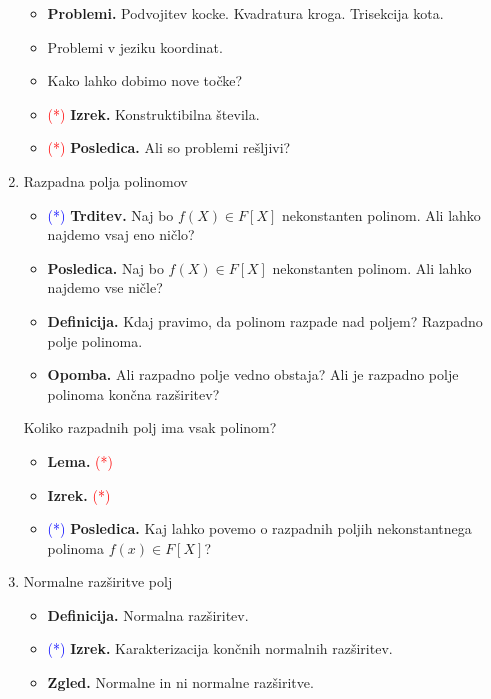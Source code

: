 \begin{enumerate}
    \begin{itemize}
        \item \textbf{Problemi.} Podvojitev kocke. Kvadratura kroga. Trisekcija kota. 
        \item Problemi v jeziku koordinat.
        \item Kako lahko dobimo nove točke?
        \item \textcolor{red}{(*)} \textbf{Izrek.} Konstruktibilna števila.
        \item \textcolor{red}{(*)} \textbf{Posledica.} Ali so problemi rešljivi?
    \end{itemize}

    \item Razpadna polja polinomov
    \begin{itemize}
        \item \textcolor{blue}{(*)} \textbf{Trditev.} Naj bo \(f(X) \in F[X]\) nekonstanten polinom. Ali lahko najdemo vsaj eno ničlo?
        \item \textbf{Posledica.} Naj bo \(f(X) \in F[X]\) nekonstanten polinom. Ali lahko najdemo vse ničle?
        \item \textbf{Definicija.} Kdaj pravimo, da polinom razpade nad poljem? Razpadno polje polinoma.
        \item \textbf{Opomba.} Ali razpadno polje vedno obstaja? Ali je razpadno polje polinoma končna razširitev?
    \end{itemize}

    Koliko razpadnih polj ima vsak polinom?
    \begin{itemize}
        \item \textbf{Lema.} \textcolor{red}{(*)}
        \item \textbf{Izrek.} \textcolor{red}{(*)}
        \item \textcolor{blue}{(*)} \textbf{Posledica.} Kaj lahko povemo o razpadnih poljih nekonstantnega polinoma \(f(x) \in F[X]\)? 
    \end{itemize}

    \item Normalne razširitve polj
    \begin{itemize}
        \item \textbf{Definicija.} Normalna razširitev.
        \item \textcolor{blue}{(*)} \textbf{Izrek.} Karakterizacija končnih normalnih razširitev.
        \item \textbf{Zgled.} Normalne in ni normalne razširitve.
    \end{itemize}


\end{enumerate}
